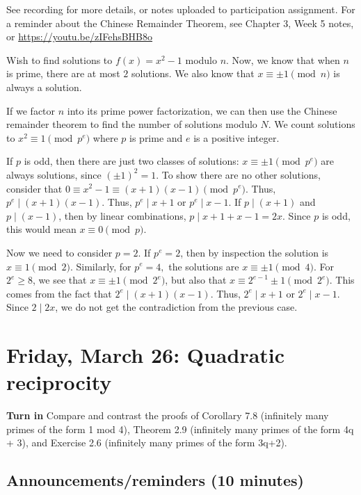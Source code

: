 \documentclass[letterpaper, 11 pt]{article}
\begin{document}
See recording for more details, or notes uploaded to participation assignment. For a reminder about the Chinese Remainder Theorem, see Chapter 3, Week 5 notes, or \url{https://youtu.be/zIFehsBHB8o}

\begin{example}[Example 3.18]
 Wish to find solutions to $f(x)=x^2-1$ modulo $n$. Now, we know that when $n$ is prime, there are at most $2$ solutions. We also know that $x\equiv \pm 1 \pmod n$ is always a solution. 
 
 If we factor $n$ into its prime power factorization, we can then use the Chinese remainder theorem to find the number of solutions modulo $N$. We count solutions to $x^2\equiv 1 \pmod{p^e}$ where $p$ is prime and $e$ is a positive integer.
 
 If $p$ is odd, then there are just two classes of solutions: $x\equiv \pm1 \pmod{p^e}$ are always solutions, since $(\pm1)^2=1$. To show there are no other solutions, consider that $0\equiv x^2-1\equiv (x+1)(x-1) \pmod{p^e}$.  Thus, $p^e\mid  (x+1)(x-1) $. Thus, $p^e\mid x+1$ or $p^e \mid x-1$. If $p\mid (x+1)$ and $p\mid (x-1)$, then by linear combinations, $p\mid x+1+x-1=2x$. Since $p$ is odd, this would mean $x\equiv 0 \pmod p$.
 
 Now we need to consider $p=2$. If $p^e=2$, then by inspection the solution is $x\equiv 1 \pmod 2$. Similarly, for $p^e=4,$ the solutions are $x\equiv \pm 1\pmod 4$. For $2^e\geq 8$, we see that $x\equiv \pm 1\pmod{2^e}$, but also that $x\equiv 2^{e-1}\pm 1 \pmod{2^e}$. This comes from the fact that $2^e\mid  (x+1)(x-1) $. Thus, $2^e\mid x+1$ or $2^e \mid x-1$. Since $2\mid 2x$, we do not get the contradiction from the previous case. 
 
 \end{example}

\section{Friday, March 26: Quadratic reciprocity}
{\bf Turn in} Compare and contrast the proofs of Corollary 7.8 (infinitely many primes of the form 1 mod 4), Theorem 2.9 (infinitely many primes of the form 4q + 3), and Exercise 2.6 (infinitely many primes of the form 3q+2).
\subsection{Announcements/reminders (10 minutes)}
\end{document}
